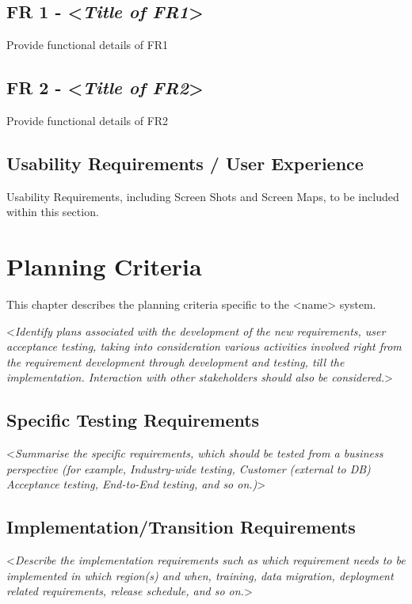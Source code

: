\documentclass[english,12pt]{scrartcl}
\newcommand{\comment}[1]{\textless\textit{#1}\textgreater\vspace*{1ex}}
\begin{document}
 
\subsection{FR 1 - \comment{Title of FR1}}
 
Provide functional details of FR1
 
\subsection{FR 2 - \comment{Title of FR2}}
 
Provide functional details of FR2
 
\subsection{Usability Requirements / User Experience}
 
Usability Requirements, including Screen Shots and Screen Maps, to be included within this section.
 
\section{Planning Criteria}
This chapter describes the planning criteria specific to the <name> system.
 
\comment{Identify plans associated with the development of the new requirements, user acceptance testing, taking into consideration various activities involved right from the requirement development through development and testing, till the implementation. Interaction with other stakeholders should also be considered.}
 
\subsection{Specific Testing Requirements}
 
\comment{Summarise the specific requirements, which should be tested from a business perspective (for example, Industry-wide testing, Customer (external to DB) Acceptance testing, End-to-End testing, and so on.)}
 
\subsection{Implementation/Transition Requirements}
 
\comment{Describe the implementation requirements such as which requirement needs to be implemented in which region(s) and when, training, data migration, deployment related requirements, release schedule, and so on.}
 
\end{document}
